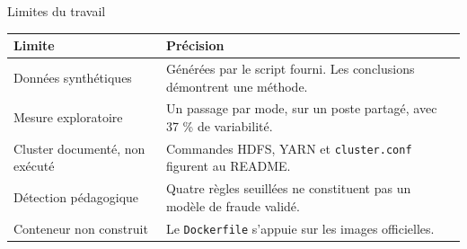 \documentclass[aspectratio=169,11pt]{beamer}
\begin{document}
\begin{frame}{Limites du travail}
  \vspace{2mm}
  \small
  \begin{tabular}{@{}p{} p{}@{}}
    \toprule
    \textbf{Limite} & \textbf{Précision} \\
    \midrule
    Données synthétiques &
      Générées par le script fourni. Les conclusions démontrent une méthode. \\[1.5mm]
    Mesure exploratoire &
      Un passage par mode, sur un poste partagé, avec 37 \% de variabilité. \\[1.5mm]
    Cluster documenté, non exécuté &
      Commandes HDFS, YARN et \texttt{cluster.conf} figurent au README. \\[1.5mm]
    Détection pédagogique &
      Quatre règles seuillées ne constituent pas un modèle de fraude validé. \\[1.5mm]
    Conteneur non construit &
      Le \texttt{Dockerfile} s'appuie sur les images officielles. \\
    \bottomrule
  \end{tabular}

\end{frame}
\end{document}
